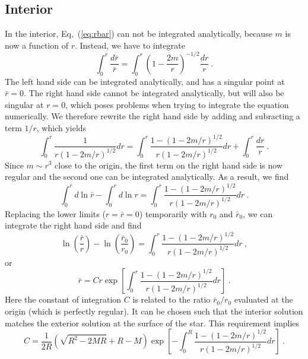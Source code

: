 \subsection{Interior}
\label{sbsc:interior}

In the interior, Eq,~(\ref{eq:rbar}) can not be integrated analytically, because
$m$ is now a function of $r$. Instead, we have to integrate
\begin{equation}
\int_0^{\bar{r}} \dfrac{d\bar{r}}{\bar{r}} = \int_0^r\left(1-\dfrac{2m}{r}\right)^{-1/2}\dfrac{dr}{r} \ .
\end{equation}
The left hand side can be integrated analytically, and has a singular point at
$\bar{r}=0$. The right hand side cannot be integrated analytically, but will also
be singular at $r=0$, which poses problems when trying to integrate the equation
numerically. We therefore rewrite the right hand side by adding and subracting
a term $1/r$, which yields
\begin{equation}
\int_0^r\dfrac{1}{r(1-2m/r)^{1/2}}dr = \int_0^r\dfrac{1-(1-2m/r)^{1/2}}{r(1-2m/r)^{1/2}}dr+\int_0^r\dfrac{dr}{r} \ .
\end{equation}
Since $m\sim r^3$ close to the origin, the first term on the right hand side is now
regular and the second one can be integrated analytically. As a result, we find
\begin{equation}
\int_0^{\bar{r}}d\ln\bar{r}-\int_0^rd\ln r=\int_0^r\dfrac{1-(1-2m/r)^{1/2}}{r(1-2m/r)^{1/2}}dr \ .
\end{equation}
Replacing the lower limits ($r=\bar{r}=0$) temporarily with $r_0$ and $\bar{r}_0$, we can integrate
the right hand side and find
\begin{equation}
\ln\left(\dfrac{\bar{r}}{r}\right)-\ln\left(\dfrac{\bar{r}_0}{r_0}\right)=\int_0^r\dfrac{1-(1-2m/r)^{1/2}}{r(1-2m/r)^{1/2}}dr \ ,
\end{equation}
or
\begin{equation}
\bar{r} = C r \exp\left[\int_0^r\dfrac{1-(1-2m/r)^{1/2}}{r(1-2m/r)^{1/2}}dr\right] \ .
\end{equation}
Here the constant of integration $C$ is related to the ratio $\bar{r}_0/r_0$ evaluated at
the origin (which is perfectly regular). It can be chosen such that the interior solution
matches the exterior solution at the surface of the star. This requirement implies
\begin{equation}
C = \dfrac{1}{2R}\left(\sqrt{R^2-2MR}+R-M\right)\exp\left[-\int_0^R\dfrac{1-(1-2m/r)^{1/2}}{r(1-2m/r)^{1/2}}dr\right] \ .
\end{equation}
